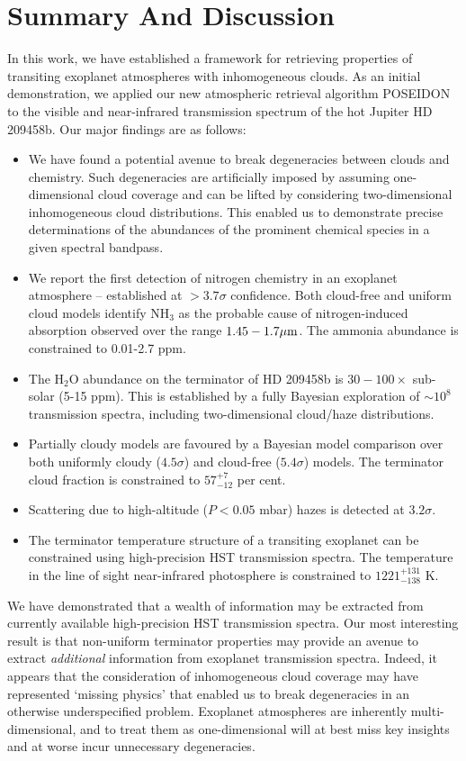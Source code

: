 \documentclass[fleqn,usenatbib]{mnras}
\begin{document}
\section{Summary And Discussion}\label{section:discussion}

In this work, we have established a framework for retrieving properties of transiting exoplanet atmospheres with inhomogeneous clouds. As an initial demonstration, we applied our new atmospheric retrieval algorithm POSEIDON to the visible and near-infrared transmission spectrum of the hot Jupiter HD 209458b. Our major findings are as follows:

\begin{itemize}
  \item We have found a potential avenue to break degeneracies between clouds and chemistry. Such degeneracies are artificially imposed by assuming one-dimensional cloud coverage and can be lifted by considering two-dimensional inhomogeneous cloud distributions. This enabled us to demonstrate precise determinations of the abundances of the prominent chemical species in a given spectral bandpass.
  \item We report the first detection of nitrogen chemistry in an exoplanet atmosphere -- established at $>3.7 \sigma$ confidence. Both cloud-free and uniform cloud models identify NH$_3$ as the probable cause of nitrogen-induced absorption observed over the range $1.45-1.7 \hbox{$\mu$m}$. The ammonia abundance is constrained to 0.01-2.7 ppm.
  \item The H$_2$O abundance on the terminator of HD 209458b is $30-100 \times$ sub-solar (5-15 ppm). This is established by a fully Bayesian exploration of $\sim 10^8$ transmission spectra, including two-dimensional cloud/haze distributions.
  \item Partially cloudy models are favoured by a Bayesian model comparison over both uniformly cloudy ($4.5\sigma$) and cloud-free ($5.4\sigma$) models. The terminator cloud fraction is constrained to $57^{+7}_{-12}$ per cent.
  \item Scattering due to high-altitude ($P< 0.05$ mbar) hazes is detected at $3.2\sigma$.
  \item The terminator temperature structure of a transiting exoplanet can be constrained using high-precision HST transmission spectra. The temperature in the line of sight near-infrared photosphere is constrained to $1221^{+131}_{-138}$ K. 
\end{itemize}

We have demonstrated that a wealth of information may be extracted from currently available high-precision HST transmission spectra. Our most interesting result is that non-uniform terminator properties may provide an avenue to extract \emph{additional} information from exoplanet transmission spectra. Indeed, it appears that the consideration of inhomogeneous cloud coverage may have represented `missing physics' that enabled us to break degeneracies in an otherwise underspecified problem. Exoplanet atmospheres are inherently multi-dimensional, and to treat them as one-dimensional will at best miss key insights and at worse incur unnecessary degeneracies.
\end{document}
